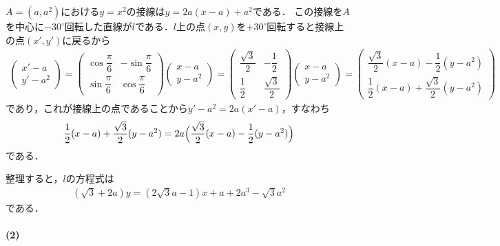 \documentclass[../../main.tex]{subfiles}
\begin{document}
$A=(a,a^2)$における$y=x^2$の接線は$y=2a(x-a)+a^2$である．
この接線を$A$を中心に$-30^\circ$回転した直線が$l$である．$l$上の点$(x,y)$を$+30^\circ$回転すると接線上の点$(x',y')$に戻るから
\begin{align}
  \begin{pmatrix}
    x'-a\\
    y'-a^2
  \end{pmatrix}
  =
  \begin{pmatrix}
    \cos\dfrac{\pi}{6} &-\sin\dfrac{\pi}{6}\\
    \sin\dfrac{\pi}{6} &\cos\dfrac{\pi}{6}
  \end{pmatrix}
  \begin{pmatrix}
    x-a\\
    y-a^2
  \end{pmatrix}
  =
  \begin{pmatrix}
    \dfrac{\sqrt{3}}{2} &-\dfrac{1}{2}\\
    \dfrac{1}{2}        & \dfrac{\sqrt{3}}{2}
  \end{pmatrix}
  \begin{pmatrix}
    x-a\\
    y-a^2
  \end{pmatrix}
  =
  \begin{pmatrix}
    \dfrac{\sqrt{3}}{2}(x-a)-\dfrac{1}{2}(y-a^2)\\[4pt]
    \dfrac{1}{2}(x-a)+\dfrac{\sqrt{3}}{2}(y-a^2)
  \end{pmatrix}
\end{align}
であり，これが接線上の点であることから$y'-a^2=2a(x'-a)$，すなわち
\begin{align}
  \dfrac{1}{2}(x-a)+\dfrac{\sqrt{3}}{2}(y-a^2)=2a\Bigl(\dfrac{\sqrt{3}}{2}(x-a)-\dfrac{1}{2}(y-a^2)\Bigr)
\end{align}
である．

整理すると，$l$の方程式は
\begin{align}
  (\sqrt{3}+2a)y=(2\sqrt{3}a-1)x+a+2a^3-\sqrt{3}a^2 \label{eq:1}
\end{align}
である．

\paragraph{(2)}
\end{document}
